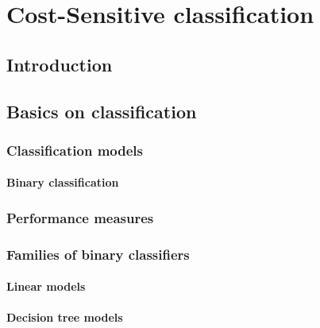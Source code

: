 \documentclass[twoside,openright,titlepage,numbers=noenddot,headinclude,%
               footinclude=true,cleardoublepage=empty,abstractoff,BCOR=5mm,%
               paper=a4,fontsize=11pt,ngerman,american,doublespace]{scrreprt}
\numberwithin{theorem}{chapter}
\numberwithin{definition}{chapter}
\numberwithin{algorithm}{chapter}
\numberwithin{figure}{chapter}
\numberwithin{table}{chapter}
\numberwithin{equation}{chapter}
\begin{document}
\frenchspacing
\raggedbottom
{}
\pagestyle{plain}



\cleardoublepage
\cleardoublepage
\cleardoublepage
\cleardoublepage
\cleardoublepage
\pagestyle{scrheadings}
\cleardoublepage





\part{Cost-Sensitive classification}

	\chapter{Introduction}

	\chapter{Basics on classification}
		\section{Classification models}
			\subsection{Binary classification}
		\section{Performance measures}
		\section{Families of binary classifiers}
			\subsection{Linear models}
			\subsection{Decision tree models}
\end{document}
